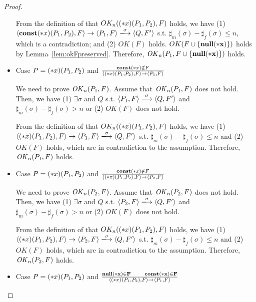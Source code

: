 \begin{proof}
\begin{itemize}
  From the definition of that \(OK_n((*x)(P_1, P_2), F)\) holds,
  we have (1) \( \langle \scon\Sirx(P_1, P_2), F \rangle \rightarrow
  \langle P_1, F \rangle \xlongrightarrow{\sigma} \langle Q, F'
  \rangle \) s.t.  \(\sharp_m(\sigma) - \sharp_f(\sigma) \le n \),
  which is a contradiction; and (2) \(OK(F)\)
  holds. \(OK(F\cup\{\bf{null}(*x)\})\) holds by
  Lemma~\ref{lem:okFpreserved}. Therefore, \(\mathit{OK}_n(P_1,
  F\cup\{\bf{null}(*x)\})\) holds.


\item Case \( P = (*x)(P_1,P_2) \) and \( \frac{ \mathbf{const}(*x) \notin F}
  { \langle (*x)(P_1, P_2), F \rangle \rightarrow \langle P_1, F
    \rangle } \)

  We need to prove \(\mathit{OK}_n(P_1, F)\).  Assume that \(\mathit{OK}_n(P_1, F)\)
  does not hold. Then, we have (1) \( \exists \sigma \) and \(Q\)
  s.t. \( \langle P_1, F \rangle \xlongrightarrow{\sigma} \langle Q,
  F' \rangle \) and \(\sharp_{m}(\sigma) - \sharp_{f}(\sigma) > n\) or
  (2) \( OK(F)\) does not hold.

  From the definition of that \(OK_n((*x)(P_1, P_2), F)\) holds, we
  have (1) \( \langle \Sirx(P_1, P_2), F \rangle \rightarrow \langle
  P_1, F \rangle \xlongrightarrow{\sigma} \langle Q, F' \rangle \)
  s.t. \(\sharp_m(\sigma) - \sharp_f(\sigma) \le n \) and (2)
  \(OK(F)\) holds, which are in contradiction to the assumption.
  Therefore, \(\mathit{OK}_n(P_1, F)\) holds.

\item Case \( P = (*x)(P_1,P_2) \) and \( \frac{ \mathbf{const}(*x) \notin F}
  { \langle (*x)(P_1, P_2), F \rangle \rightarrow \langle P_2, F
    \rangle } \)

  We need to prove \(\mathit{OK}_n(P_2, F)\).  Assume that \(\mathit{OK}_n(P_2, F)\)
  does not hold. Then, we have (1) \( \exists \sigma \) and \(Q\)
  s.t. \( \langle P_2, F \rangle \xlongrightarrow{\sigma} \langle Q,
  F' \rangle \) and \(\sharp_{m}(\sigma) - \sharp_{f}(\sigma) > n\) or
  (2) \( OK(F)\) does not hold.

  From the definition of that \(OK_n((*x)(P_1, P_2), F)\) holds, we
  have (1) \( \langle \Sirx(P_1, P_2), F \rangle \rightarrow \langle
  P_2, F \rangle \xlongrightarrow{\sigma} \langle Q, F' \rangle \)
  s.t. \(\sharp_m(\sigma) - \sharp_f(\sigma) \le n \) and (2)
  \(OK(F)\) holds, which are in contradiction to the assumption.
  Therefore, \(\mathit{OK}_n(P_2, F)\) holds.

\item Case \( P = (*x)(P_1,P_2) \) and \( \frac{ \bf{null}(*x) \in F
  \quad\quad \mathbf{const}(*x) \in F} { \langle (*x)(P_1, P_2), F \rangle
  \rightarrow \langle P_1, F \rangle } \)


\end{itemize}
\end{proof}
